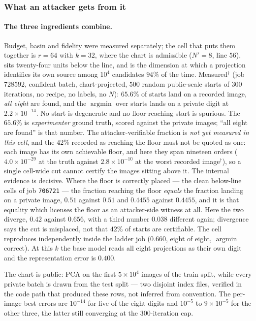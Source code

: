 \subsubsection*{What an attacker gets from it}

\paragraph{The three ingredients combine.} Budget, basin and fidelity were
measured separately; the cell that puts them together is $r=64$ with
$k=32$, where the chart is admissible ($N'=8$, line $56$), sits twenty-four
units below the line, and is the dimension at which a projection identifies
its own source among $10^4$ candidates $94\%$ of the time. Measured$^\dagger$
(job 728592, confident batch, chart-projected, $500$ random public-scale
starts of $300$ iterations, no recipe, no labels, no $N$): $65.6\%$ of starts
land on a recorded image, \emph{all eight} are found, and the
$\operatorname{argmin}$ over starts lands on a private digit at
$2.2\times10^{-14}$. No start is degenerate and no floor-reaching start is
spurious. The $65.6\%$ is \emph{experimenter} ground truth, scored against the
private images; ``all eight are found'' is that number. The
attacker-verifiable fraction is \emph{not yet measured in this cell}, and the
$42\%$ recorded as reaching the floor must not be quoted as one: each image
has its own achievable floor, and here they span nineteen orders
($4.0\times10^{-29}$ at the truth against $2.8\times10^{-10}$ at the worst
recorded image$^\dagger$), so a single cell-wide cut cannot certify the images
sitting above it. The internal evidence is decisive. Where the floor is
correctly placed --- the clean below-line cells of job \texttt{706721} --- the
fraction reaching the floor \emph{equals} the fraction landing on a private
image, $0.51$ against $0.51$ and $0.4455$ against $0.4455$, and it is that
equality which licenses the floor as an attacker-side witness at all. Here the
two diverge, $0.42$ against $0.656$, with a third number $0.038$ different
again; divergence says the cut is misplaced, not that $42\%$ of starts are
certifiable. The cell reproduces independently inside the ladder job ($0.660$,
eight of eight, $\operatorname{argmin}$ correct). At this $k$ the base model
reads all eight projections as their own digit and the representation error
is $0.400$.

The chart is public: PCA on the first $5\times10^4$ images of the train
split, while every private batch is drawn from the test split --- two disjoint
index files, verified in the code path that produced these rows, not inferred
from convention. The per-image best errors are $10^{-14}$ for five of the
eight digits and $10^{-5}$ to $9\times10^{-5}$ for the other three, the latter
still converging at the $300$-iteration cap.

